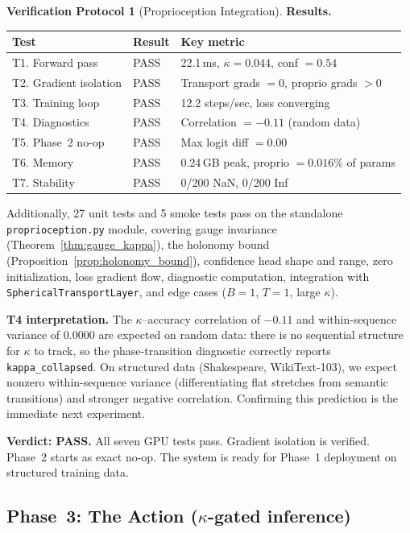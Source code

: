 \documentclass[11pt,a4paper]{article}
\theoremstyle{definition}
\newtheorem{protocol}[theorem]{Verification Protocol}
\theoremstyle{remark}
\begin{document}
\begin{protocol}[Proprioception Integration]
\textbf{Results.}
\begin{center}
\begin{tabular}{lll}
\toprule
\textbf{Test} & \textbf{Result} & \textbf{Key metric} \\
\midrule
T1. Forward pass & PASS & 22.1\,ms, $\kappa = 0.044$, conf $= 0.54$ \\
T2. Gradient isolation & PASS & Transport grads $= 0$, proprio grads $> 0$ \\
T3. Training loop & PASS & 12.2 steps/sec, loss converging \\
T4. Diagnostics & PASS & Correlation $= -0.11$ (random data) \\
T5. Phase~2 no-op & PASS & Max logit diff $= 0.00$ \\
T6. Memory & PASS & 0.24\,GB peak, proprio $= 0.016\%$ of params \\
T7. Stability & PASS & 0/200 NaN, 0/200 Inf \\
\bottomrule
\end{tabular}
\end{center}

Additionally, 27 unit tests and 5 smoke tests pass on the standalone 
\texttt{proprioception.py} module, covering gauge invariance 
(Theorem~\ref{thm:gauge_kappa}), the holonomy bound 
(Proposition~\ref{prop:holonomy_bound}), confidence head shape 
and range, zero initialization, loss gradient flow, diagnostic 
computation, integration with \texttt{SphericalTransportLayer}, 
and edge cases ($B = 1$, $T = 1$, large $\kappa$).

\textbf{T4 interpretation.} The $\kappa$--accuracy correlation of 
$-0.11$ and within-sequence variance of $0.0000$ are expected on 
random data: there is no sequential structure for $\kappa$ to 
track, so the phase-transition diagnostic correctly reports 
\texttt{kappa\_collapsed}. On structured data (Shakespeare, 
WikiText-103), we expect nonzero within-sequence variance 
(differentiating flat stretches from semantic transitions) and 
stronger negative correlation. Confirming this prediction is the 
immediate next experiment.

\textbf{Verdict: PASS.} All seven GPU tests pass. Gradient 
isolation is verified. Phase~2 starts as exact no-op. The system 
is ready for Phase~1 deployment on structured training data.
\end{protocol}

\subsection{Phase~3: The Action ($\kappa$-gated inference)}
\label{sec:proprio_phase3}
\end{document}
